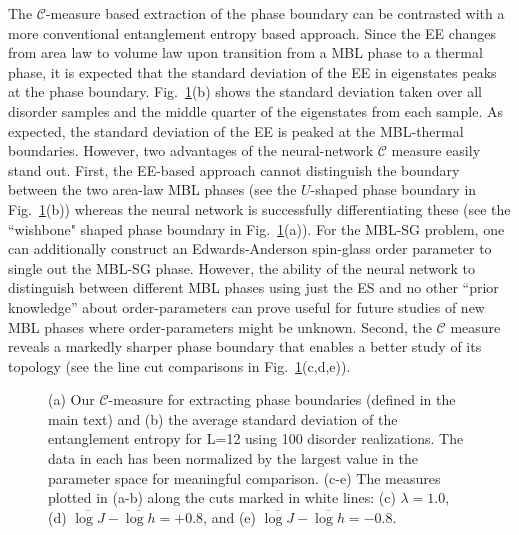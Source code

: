 \documentclass[amsmath,amssymb, aps, prb, superscriptaddress,twocolumn]{revtex4-1}
\begin{document}
The ${\mathcal{C}}$-measure based extraction of the phase boundary can be contrasted with a more conventional entanglement entropy based approach\cite{Kjall14}. 
Since the EE changes from area law to volume law upon transition from a MBL phase to a thermal phase, it is expected that the standard deviation of the EE in eigenstates peaks at the phase boundary\cite{Kjall14}. 
Fig.~\ref{fig:Variance}(b) shows the standard deviation taken over all disorder samples and  the middle quarter of the eigenstates from each sample.
As expected, the standard deviation of the EE is peaked at the MBL-thermal boundaries. However, two advantages of the neural-network $\mathcal{C}$ measure easily stand out. First, the EE-based approach cannot distinguish the boundary between the two area-law MBL phases (see the $U$-shaped phase boundary in Fig.~\ref{fig:Variance}(b)) whereas the neural network is successfully differentiating these (see  the ``wishbone" shaped phase boundary in Fig.~\ref{fig:Variance}(a)). For the MBL-SG problem, one can additionally construct an Edwards-Anderson spin-glass order parameter to single out the MBL-SG phase\cite{Kjall14}. However, the ability of the neural network to distinguish between different MBL phases using just the ES and no other ``prior knowledge'' about order-parameters can prove useful for future studies of new MBL phases where order-parameters might be unknown. 
Second, the ${\mathcal{C}}$ measure reveals a markedly sharper phase boundary that enables a better study of its topology (see the line cut comparisons in Fig.~\ref{fig:Variance}(c,d,e)). 

\begin{figure}[ht]
\centering
\vspace{10pt}

\caption{(a) Our $\mathcal{C}$-measure for extracting phase boundaries (defined in the main text) and (b) the average standard deviation of the entanglement entropy for L=12 using 100 disorder realizations. The data in each has been normalized by the largest value in the parameter space for meaningful comparison.
(c-e) The measures plotted in (a-b) along the cuts marked in white lines:
(c) $\lambda = 1.0$, (d) $\overline{\log J} - \overline{\log h} = +0.8$, and (e) $\overline{\log J} - \overline{\log h} = -0.8$. }
\label{fig:Variance}
\end{figure}
\end{document}
